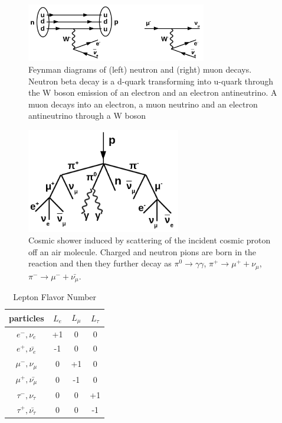 \begin{figure}
\caption{Feynman diagrams of (left) neutron and (right) muon decays. Neutron beta decay is a d-quark transforming into u-quark through the W boson emission of an electron and an electron antineutrino. A muon decays into an electron, a muon neutrino and an electron antineutrino through a W boson}
\label{fig:MuonAndNeutronDecays}
\centering
\includegraphics[width=0.70\textwidth, keepaspectratio=true]{figs/NeutronAndMuonDecays.png}
\end{figure}
\begin{figure}
\caption{Cosmic shower induced by scattering of the incident cosmic proton off an air molecule. Charged and neutron pions are born in the reaction and then they further decay as $\pi^0 \rightarrow \gamma\gamma$, $\pi^+ \rightarrow \mu^+ + \nu_\mu$, $\pi^- \rightarrow \mu^- + \bar{\nu_\mu}$.}
\label{fig:cosmicMuons}
\centering
\includegraphics[width=0.60\textwidth, keepaspectratio=true]{figs/cosmicMuons.png}
\end{figure}
\begin{table}[h]
  \begin{center}
  \caption{ Lepton Flavor Number}
  \begin{tabular}{|c|c|c|c|}
     particles & $L_e$ & $L_{\mu}$ & $L_{\tau}$ \\ \hline
     $e^-,\nu_e$ &  +1  &  0  &  0  \\ \hline 
     $e^+, \bar{\nu_e}$ &  -1  &  0  &  0  \\ \hline 
     $\mu^-,\nu_{\mu}$ &  0  &  +1  &  0  \\ \hline 
     $\mu^+, \bar{\nu_{\mu}}$ &  0  &  -1  &  0  \\ \hline 
     $\tau^-,\nu_{\tau}$ &  0  &  0  &  +1  \\ \hline 
     $\tau^+, \bar{\nu_{\tau}}$ &  0  &  0  &  -1  \\ \hline 
  \end{tabular}
  \label{tab:LeptonFlavorNumber}
  \end{center}
\end{table}
